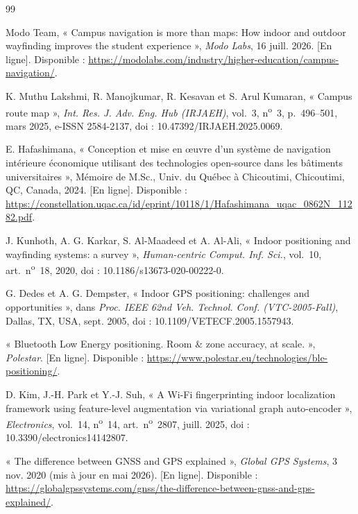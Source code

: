 \documentclass[12pt,a4paper]{report}
\begin{document}
\begin{thebibliography}{99}

 Modo Team, « Campus navigation is more than maps: How indoor and outdoor wayfinding
improves the student experience », \emph{Modo Labs}, 16 juill. 2026. [En ligne]. Disponible :
\url{https://modolabs.com/industry/higher-education/campus-navigation/}.

 K. Muthu Lakshmi, R. Manojkumar, R. Kesavan et S. Arul Kumaran, « Campus route
map », \emph{Int. Res. J. Adv. Eng. Hub (IRJAEH)}, vol.~3, n\textsuperscript{o}~3, p.~496--501,
mars 2025, e-ISSN 2584-2137, doi : 10.47392/IRJAEH.2025.0069.

 E. Hafashimana, « Conception et mise en œuvre d'un système de navigation
intérieure économique utilisant des technologies open-source dans les bâtiments universitaires »,
Mémoire de M.Sc., Univ. du Québec à Chicoutimi, Chicoutimi, QC, Canada, 2024. [En ligne].
Disponible : \url{https://constellation.uqac.ca/id/eprint/10118/1/Hafashimana_uqac_0862N_11282.pdf}.

 J. Kunhoth, A. G. Karkar, S. Al-Maadeed et A. Al-Ali, « Indoor positioning and
wayfinding systems: a survey », \emph{Human-centric Comput. Inf. Sci.}, vol.~10,
art.~n\textsuperscript{o}~18, 2020, doi : 10.1186/s13673-020-00222-0.

 G. Dedes et A. G. Dempster, « Indoor GPS positioning: challenges and
opportunities », dans \emph{Proc. IEEE 62nd Veh. Technol. Conf. (VTC-2005-Fall)}, Dallas, TX, USA,
sept. 2005, doi : 10.1109/VETECF.2005.1557943.

 « Bluetooth Low Energy positioning. Room \& zone accuracy, at scale. »,
\emph{Polestar}. [En ligne]. Disponible : \url{https://www.polestar.eu/technologies/ble-positioning/}.

 D. Kim, J.-H. Park et Y.-J. Suh, « A Wi-Fi fingerprinting indoor localization
framework using feature-level augmentation via variational graph auto-encoder »,
\emph{Electronics}, vol.~14, n\textsuperscript{o}~14, art.~n\textsuperscript{o}~2807, juill. 2025,
doi : 10.3390/electronics14142807.

 « The difference between GNSS and GPS explained », \emph{Global GPS Systems},
3 nov. 2020 (mis à jour en mai 2026). [En ligne]. Disponible :
\url{https://globalgpssystems.com/gnss/the-difference-between-gnss-and-gps-explained/}.


\end{thebibliography}
\end{document}
